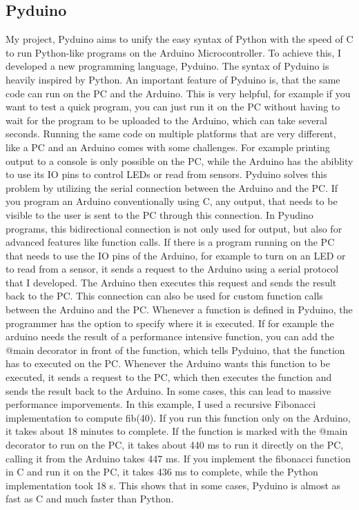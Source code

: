 \documentclass{article}
\begin{document}
\begin{multicols}{2}
\section{Pyduino}
My project, Pyduino aims to unify the easy syntax of Python with the speed of C to run Python-like programs on the Arduino Microcontroller. To achieve this, I developed a new programming language, Pyduino. The syntax of Pyduino is heavily inspired by Python. 
An important feature of Pyduino is, that the same code can run on the PC and the Arduino. This is very helpful, for example if you want to test a quick program, you can just run it on the PC without having to wait for the program to be uploaded to the Arduino, which can take several seconds. Running the same code on multiple platforms that are very different, like a PC and an Arduino comes with some challenges. For example printing output to a console is only possible on the PC, while the Arduino has the abiblity to use its IO pins to control LEDs or read from sensors. Pyduino solves this problem by utilizing the serial connection between the Arduino and the PC. If you program an Arduino conventionally using C, any output, that needs to be visible to the user is sent to the PC through this connection. In Pyudino programs, this bidirectional connection is not only used for output, but also for advanced features like function calls. If there is a program running on the PC that needs to use the IO pins of the Arduino, for example to turn on an LED or to read from a sensor, it sends a request to the Arduino using a serial protocol that I developed. The Arduino then executes this request and sends the result back to the PC. This connection can also be used for custom function calls between the Arduino and the PC. Whenever a function is defined in Pyduino, the programmer has the option to specify where it is executed. If for example the arduino needs the result of a performance intensive function, you can add the @main decorator in front of the function, which tells Pyduino, that the function has to executed on the PC. Whenever the Arduino wants this function to be executed, it sends a request to the PC, which then executes the function and sends the result back to the Arduino. In some cases, this can lead to massive performance imporvements. In this example, I used a recursive Fibonacci implementation to compute fib(40). If you run this function only on the Arduino, it takes about 18 minutes to complete. If the function is marked with the @main decorator to run on the PC, it takes about 440 ms to run it directly on the PC, calling it from the Arduino takes 447 ms. If you implement the fibonacci function in C and run it on the PC, it takes 436 ms to complete, while the Python implementation took 18 s. This shows that in some cases, Pyduino is almost as fast as C and much faster than Python. \\

\end{multicols}
\end{document}
